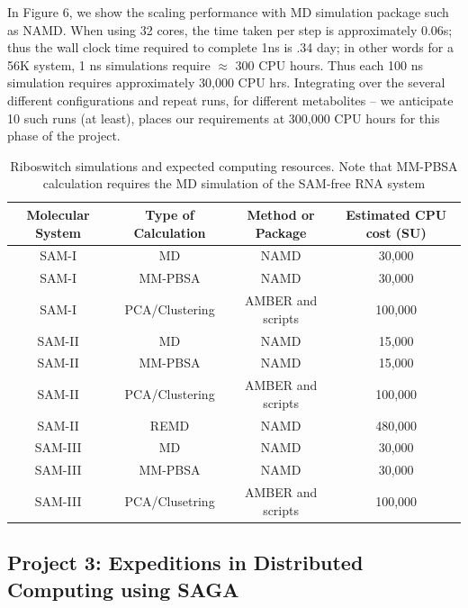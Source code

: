 \documentclass[a4paper,10pt]{article}
\begin{document}
In Figure 6, we show the scaling performance with MD simulation package such as NAMD.  When using 32 cores, the time taken per step is approximately 0.06s; thus the wall clock time required to complete 1ns is .34 day; in other words for a 56K system, 1 ns simulations require $\approx$ 300 CPU hours. Thus each 100 ns simulation requires approximately 30,000 CPU hrs. Integrating over the several different configurations and repeat runs, for different metabolites -- we anticipate 10 such runs (at least), places our requirements at 300,000 CPU hours for this phase of the project.


\begin{table}[!h]
\begin{center}
  \caption{Riboswitch simulations and expected computing resources. Note that MM-PBSA calculation requires the MD simulation of the SAM-free RNA system}
\label{table:systems}
\begin{tabular}{| c | c | c | c |}
\hline
Molecular System & Type of Calculation &   Method or Package  &  Estimated CPU cost (SU) \\
\hline
SAM-I & MD &  NAMD &  30,000\\
SAM-I & MM-PBSA & NAMD & 30,000 \\
SAM-I & PCA/Clustering &  AMBER and scripts &  100,000\\
SAM-II &MD &  NAMD &  15,000\\
SAM-II & MM-PBSA & NAMD & 15,000 \\
SAM-II & PCA/Clustering & AMBER and scripts & 100,000 \\
SAM-II & REMD &  NAMD &  480,000\\
SAM-III &MD &  NAMD &  30,000\\
SAM-III & MM-PBSA & NAMD & 30,000 \\
SAM-III & PCA/Clusetring & AMBER and scripts & 100,000 \\
\hline
\end{tabular}
\end{center}
\end{table}


\subsection*{Project 3: Expeditions in Distributed Computing using SAGA}
\end{document}
